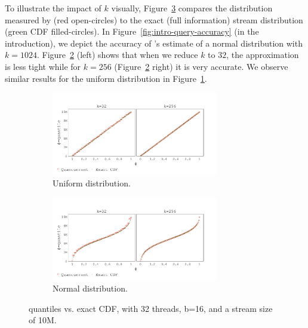 To illustrate the impact of $k$ visually, Figure~\ref{fig:cdf} compares the distribution measured by \mysketch (red open-circles) to the exact (full information) stream distribution (green CDF filled-circles). In Figure~\ref{fig:intro-query-accuracy} (in the introduction), we depict the accuracy of \mysketch's estimate of a normal distribution with $k=1024$. Figure~\ref{fig:cdf_normal} (left) shows that when we reduce $k$ to $32$, the approximation is less tight while for $k=256$ (Figure~\ref{fig:cdf_normal} right) it is very accurate. We observe similar results for the uniform distribution in Figure~\ref{fig:cdf_uniform}. 

\begin{figure}[h!]
\centering
    \begin{subfigure}[]{\textwidth}
        \centering
        \includegraphics[width=0.8\textwidth,trim={0.1cm 0.2cm 1.5cm 1cm},clip]
        {graphics/graphs/accuracy/Oracle_Quancurrent_blocking_numa_cdf_uniform_ks_32_256_b16_keys10M_runs1_uT_32_qT1_snapshot1_17-09-2022_06-51-43.pdf}
        \caption{Uniform distribution.} \label{fig:cdf_uniform}
    \end{subfigure}
    
    \begin{subfigure}[]{\textwidth}
        \centering
        \includegraphics[width=0.8\textwidth,trim={0.1cm 0.2cm 1.5cm 1cm},clip]
        {graphics/graphs/accuracy/Oracle_Quancurrent_blocking_numa_cdf_normal_ks_32_256_b16_keys10M_runs1_uT_32_qT1_snapshot1_17-09-2022_06-51-43.pdf}
        \caption{Normal distribution.} \label{fig:cdf_normal}
    \end{subfigure}

\caption{\mysketch quantiles vs. exact CDF, with 32 threads, b=16, and a stream size of 10M.} \label{fig:cdf}
\end{figure}

